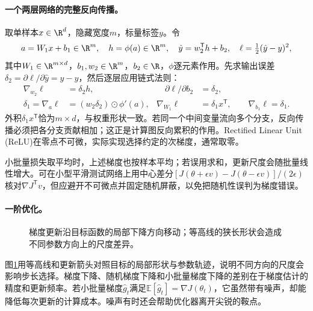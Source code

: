 \paragraph{一个两层网络的完整反向传播。}
取单样本$x\in\R^d$，隐藏宽度$m$，标量标签$y$。令
\begin{equation}
 a=W_1x+b_1\in\R^m,\quad h=\phi(a)\in\R^m,\quad
 \hat y=w_2^{\mathsf T}h+b_2,\quad \ell=\tfrac12(\hat y-y)^2,
\end{equation}
其中$W_1\in\R^{m\times d}$，$b_1,w_2\in\R^m$，$b_2\in\R$，$\phi$逐元素作用。先求输出误差$\delta_2=\partial\ell/\partial\hat y=\hat y-y$，然后逐层应用链式法则：
\begin{align}
 \nabla_{w_2}\ell&=\delta_2h,&\quad \partial\ell/\partial b_2&=\delta_2,\\
 \delta_1=\nabla_a\ell&=(w_2\delta_2)\odot\phi'(a),&
 \nabla_{W_1}\ell&=\delta_1x^{\mathsf T},\qquad \nabla_{b_1}\ell=\delta_1.
\end{align}
外积$\delta_1x^{\mathsf T}$恰为$m\times d$，与权重形状一致。若同一个中间变量流向多个分支，反向传播必须把各分支贡献相加；这正是计算图反向累积的作用。Rectified Linear Unit (ReLU)在零点不可微，实际实现选择约定的次梯度，通常取零。

小批量损失取平均时，上述梯度也按样本平均；若误用求和，更新尺度会随批量线性增大。可在小型平滑测试网络上用中心差分$[J(\theta+\epsilon v)-J(\theta-\epsilon v)]/(2\epsilon)$核对$\nabla J^{\mathsf T}v$，但应避开不可微点并固定随机屏蔽，以免把随机性误判为梯度错误。

\paragraph{一阶优化。}
\begin{figure}[htbp]
\centering
{}
\caption{梯度更新沿目标函数的局部下降方向移动；等高线的狭长形状会造成不同参数方向上的尺度差异。}
\label{fig:optimization-descent-path}
\end{figure}
图\ref{fig:optimization-descent-path}用等高线和更新箭头对照目标的局部形状与参数轨迹，说明不同方向的尺度会影响步长选择。梯度下降、随机梯度下降和小批量梯度下降的差别在于梯度估计的精度和更新频率。若小批量梯度$\hat g_t$满足$\mathbb{E}[\hat g_t]=\nabla J(\theta_t)$，它虽然带有噪声，却能降低每次更新的计算成本。噪声有时还会帮助优化器离开尖锐的鞍点。

